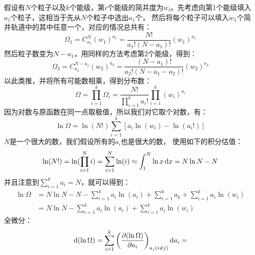 \begin{prove}
            假设有$N$个粒子以及$k$个能级，第$i$个能级的简并度为$w_i$。先考虑向第1个能级填入$a_1$个粒子，这相当于先从$N$个粒子中选出$a_1$个，
            然后将每个粒子可以填入$w_1$个简并轨道中的其中任意一个，对应的情况总共有：
            \begin{equation}
                \Omega_1 =C_{a_1}^{N} (w_1)^{a_1} = \frac{N!}{a_{1}!(N-a_{1})!} (w_1)^{a_1}
            \end{equation}
            然后粒子数变为$N-a_1$，用同样的方法考虑第2个能级，得到：
            \begin{equation}
                \Omega_2 =C_{a_2}^{N-a_1} (w_2)^{a_2} = \frac{(N-a_1)!}{a_{2}!(N-a_{1}-a_{2})!} (w_2)^{a_2}
            \end{equation}
            以此类推，并将所有可能数相乘，得到分布数：
            \begin{equation}
                \Omega = \prod_{i=1}^{k} \Omega_{i} = \frac{N!}{\prod_{i = 1}^{k}a_{i}!}\prod_{i = 1}^{k} (w_i)^{a_i}
            \end{equation}
            因为对数与原函数在同一点取极值，所以我们对它取个对数，有：
            \begin{equation}
                \ln\Omega = \ln(N!)\sum_{i = 1}^{k}[{a_i}\ln(w_i) - \ln(a_i!)]
            \end{equation}
            $N$是一个很大的数，我们假设所有的$a_i$也是很大的数，
            使用如下的积分估值：
            \begin{equation}
                \ln(N!) = \ln(\prod_{i=1}^{N}i)=\sum_{i=1}^{N}\ln(i) \approx \int_{1}^{N}\ln x\dif{x} = N\ln N-N
            \end{equation}
            并且注意到$\sum_{i=1}^{k}a_i=N$，就可以得到：
            \begin{equation}
                \begin{aligned}
                    \ln\Omega &= N\ln N-N-\sum_{i=1}^{k}a_{i}\ln(a_i)+\sum_{i=1}^{k}a_k+\sum_{i = 1}^{k}{a_i}\ln(w_i)\\
                    &=N\ln N-\sum_{i=1}^{k}a_{i}\ln(a_i)+\sum_{i = 1}^{k}{a_i}\ln(w_i)
                    \label{of_omega}
                \end{aligned}
            \end{equation}
            全微分：
            \begin{equation}
                \dif{(\ln\Omega)} = \sum_{i=1}^{k}\left(\frac{\partial (\ln\Omega)}{\partial a_i}\right)_{a_j(i\neq j)} \dif{a_i} = 

\end{equation}
\end{prove}
